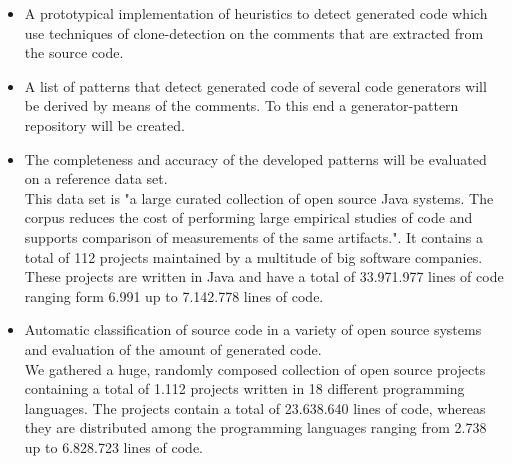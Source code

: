 \begin{itemize}
	\item A prototypical implementation of heuristics to detect generated code which use techniques of clone-detection on the comments that are extracted from the source code.
	\item A list of patterns that detect generated code of several code generators will be derived by means of the comments. To this end a generator-pattern repository will be created.
	\item The completeness and accuracy of the developed patterns will be evaluated on a reference data set.\\
	This data set is "a large curated collection of open source Java systems. The corpus reduces the cost of performing
	large empirical studies of code and supports comparison of measurements of the same artifacts."\cite[p.~1]{TemperoEwanandAnslowCraigandDietrichJensandHanTedandLiJingandLumpeMarkusandMeltonHaydenandNoble2010a}. It contains a total of 112 projects maintained by a multitude of big software companies. These projects are written in Java and have a total of 33.971.977 lines of code ranging form 6.991 up to 7.142.778 lines of code.
	\item Automatic classification of source code in a variety of open source systems and evaluation of the amount of generated code.\\
	We gathered a huge, randomly composed collection of open source projects containing a total of 1.112 projects written in 18 different programming languages. The projects contain a total of 23.638.640 lines of code, whereas they are distributed among the programming languages ranging from 2.738 up to 6.828.723 lines of code. 
\end{itemize}